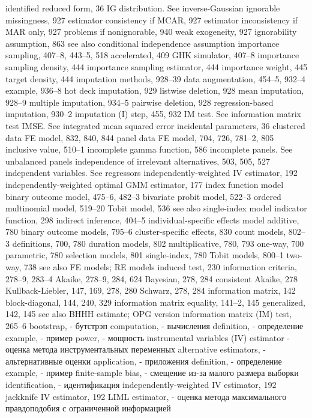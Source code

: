 identified reduced form, 36
IG distribution. See inverse-Gaussian ignorable missingness, 927
estimator consistency if MCAR, 927 estimator inconsistency if MAR only, 927 problems if nonignorable, 940
weak exogeneity, 927
ignorability assumption, 863
see also conditional independence assumption
importance sampling, 407–8, 443–5, 518 accelerated, 409
GHK simulator, 407–8
importance sampling density, 444 importance sampling estimator, 444 importance weight, 445
target density, 444 imputation methods, 928–39
data augmentation, 454–5, 932–4 example, 936–8
hot deck imputation, 929
listwise deletion, 928
mean imputation, 928–9
multiple imputation, 934–5 pairwise deletion, 928 regression-based imputation, 930–2
imputation (I) step, 455, 932
IM test. See information matrix test IMSE. See integrated mean squared error incidental parameters, 36
clustered data FE model, 832, 840, 844
panel data FE model, 704, 726, 781–2, 805 inclusive value, 510–1
incomplete gamma function, 586
incomplete panels. See unbalanced panels independence of irrelevant alternatives, 503, 505, 527 independent variables. See regressors independently-weighted IV estimator, 192 independently-weighted optimal GMM estimator, 177 index function model
binary outcome model, 475–6, 482–3 bivariate probit model, 522–3 ordered multinomial model, 519–20 Tobit model, 536
see also single-index model indicator function, 298
indirect inference, 404–5 individual-specific effects model
additive, 780
binary outcome models, 795–6 cluster-specific effects, 830 count models, 802–3 definitions, 700, 780
duration models, 802 multiplicative, 780, 793 one-way, 700
parametric, 780
selection models, 801 single-index, 780
Tobit models, 800–1
two-way, 738
see also FE models; RE models
induced test, 230
information criteria, 278–9, 283–4
Akaike, 278–9, 284, 624
Bayesian, 278, 284
consistent Akaike, 278 Kullback-Liebler, 147, 169, 278, 280 Schwarz, 278, 284
information matrix, 142 block-diagonal, 144, 240, 329
information matrix equality, 141–2, 145 generalized, 142, 145
see also BHHH estimate; OPG version
information matrix (IM) test, 265–6 
bootstrap, - бутстрэп
computation, - вычисления
definition, - определение
example, - пример
power, - мощность
instrumental variables (IV) estimator - оценка метода инструментальных переменных
alternative estimators, - альтернативные оценки
application, - приложения
definition, - определение
example, - пример
finite-sample bias, - смещение из-за малого размера выборки 
identification, - идентификация 
independently-weighted IV estimator, 192 jackknife IV estimator, 192
LIML estimator, - оценка метода максимального правдоподобия с ограниченной информацией
